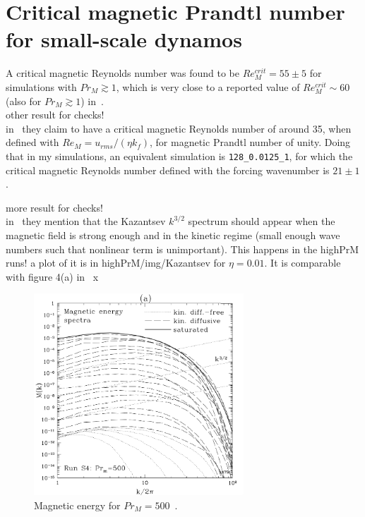 \documentclass[12pt,a4paper]{report}
\begin{document}
\section{Critical magnetic Prandtl number for small-scale dynamos}

A critical magnetic Reynolds number was found to be $Re_M^{crit}=55\pm5$ for simulations with $Pr_M\gtrsim1$, which is very close to a reported value of $Re_M^{crit}\sim60$ (also for $Pr_M\gtrsim1$) in~\cite{schekochihin2007fluctuation}.\\

other result for checks!\\

in~\cite{haugen2004simulations} they claim to have a critical magnetic Reynolds number of around 35, when defined with $Re_M=u_{rms}/(\eta k_f)$, for magnetic Prandtl number of unity. Doing that in my simulations, an equivalent simulation is \texttt{128\_0.0125\_1}, for which the critical magnetic Reynolds number defined with the forcing wavenumber is $21 \pm 1$.

more result for checks!\\

in~\cite{haugen2004simulations} they mention that the Kazantsev $k^{3/2}$ spectrum should appear when the magnetic field is strong enough and in the kinetic regime (small enough wave numbers such that nonlinear term is unimportant). This happens in the highPrM runs! a plot of it is in {highPrM/img/Kazantsev} for $\eta=0.01$. It is comparable with figure 4(a) in~\cite{schekochihin2004simulations} x

\begin{figure}[!ht]
\centering
\includegraphics[width=0.7\textwidth]{img/k3halfs}
\caption{Magnetic energy for $Pr_M=500$~\cite{schekochihin2004simulations}.}
\label{figure}
\end{figure}
\end{document}
